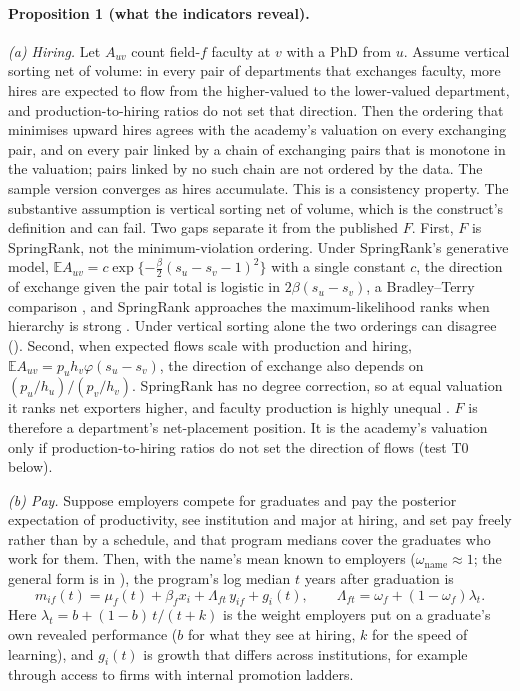 \paragraph{Proposition 1 (what the indicators reveal).} \emph{(a) Hiring.} Let $A_{uv}$ count field-$f$ faculty
at $v$ with a PhD from $u$. Assume vertical sorting net of volume: in every pair of departments that exchanges
faculty, more hires are expected to flow from the higher-valued to the lower-valued department, and
production-to-hiring ratios do not set that direction. Then the ordering that minimises upward hires agrees with
the academy's valuation on every exchanging pair, and on every pair linked by a chain of exchanging pairs that is
monotone in the valuation; pairs linked by no such chain are not ordered by the data. The sample version
converges as hires accumulate. This is a consistency property. The substantive assumption is vertical sorting
net of volume, which is the construct's definition and can fail. Two gaps separate it from the published $F$.
First, $F$ is SpringRank, not the minimum-violation ordering. Under SpringRank's generative model,
$\mathbb E A_{uv}=c\exp\{-\tfrac{\beta}{2}(s_u-s_v-1)^2\}$ with a single constant $c$, the direction of exchange
given the pair total is logistic in $2\beta(s_u-s_v)$, a Bradley--Terry comparison \citep{bradley1952rank}, and
SpringRank approaches the maximum-likelihood ranks when hierarchy is strong \citep{debacco2018physical}. Under
vertical sorting alone the two orderings can disagree (\SItheory). Second, when expected flows scale with
production and hiring, $\mathbb E A_{uv}=p_uh_v\varphi(s_u-s_v)$, the direction of exchange also depends on
$(p_u/h_u)/(p_v/h_v)$. SpringRank has no degree correction, so at equal valuation it ranks net exporters higher,
and faculty production is highly unequal \citep{wapman2022quantifying}. $F$ is therefore a department's
net-placement position. It is the academy's valuation only if production-to-hiring ratios do not set the
direction of flows (test T0 below).

\emph{(b) Pay.} Suppose employers compete for graduates and pay the posterior expectation of productivity, see
institution and major at hiring, and set pay freely rather than by a schedule, and that program medians cover the
graduates who work for them. Then, with the name's mean known to employers ($\omega_{\text{name}}\approx1$; the
general form is in \SItheory), the program's log median $t$ years after graduation is
\begin{equation}\label{eq:theory-wage}
m_{if}(t)=\mu_f(t)+\beta_fx_i+\Lambda_{ft}\,y_{if}+g_{i}(t),\qquad \Lambda_{ft}=\omega_f+(1-\omega_f)\lambda_t .
\end{equation}
Here $\lambda_t=b+(1-b)\,t/(t+k)$ is the weight employers put on a graduate's own revealed performance ($b$ for
what they see at hiring, $k$ for the speed of learning), and $g_i(t)$ is growth that differs across
institutions, for example through access to firms with internal promotion ladders.

